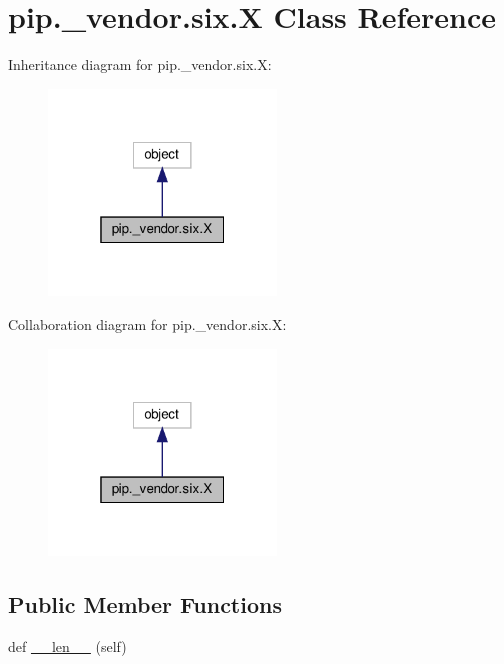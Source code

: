 \hypertarget{classpip_1_1__vendor_1_1six_1_1X}{}\section{pip.\+\_\+vendor.\+six.\+X Class Reference}
\label{classpip_1_1__vendor_1_1six_1_1X}


Inheritance diagram for pip.\+\_\+vendor.\+six.\+X\+:
\nopagebreak
\begin{figure}[H]
\begin{center}
\leavevmode
\includegraphics[width=172pt]{classpip_1_1__vendor_1_1six_1_1X__inherit__graph}
\end{center}
\end{figure}


Collaboration diagram for pip.\+\_\+vendor.\+six.\+X\+:
\nopagebreak
\begin{figure}[H]
\begin{center}
\leavevmode
\includegraphics[width=172pt]{classpip_1_1__vendor_1_1six_1_1X__coll__graph}
\end{center}
\end{figure}
\subsection*{Public Member Functions}
\begin{DoxyCompactItemize}
\item 
def \hyperlink{classpip_1_1__vendor_1_1six_1_1X_a866594d3db952940f101e7454b0ab76b}{\+\_\+\+\_\+len\+\_\+\+\_\+} (self)
\end{DoxyCompactItemize}


